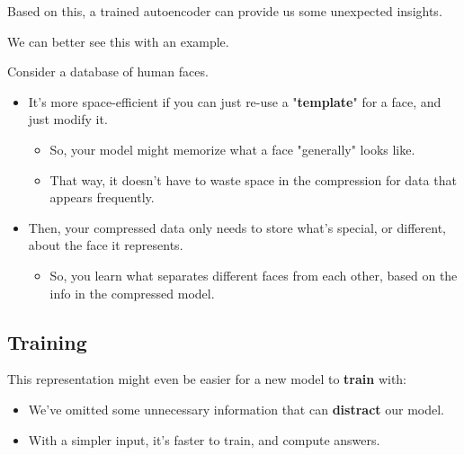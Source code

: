         Based on this, a trained autoencoder can provide us some unexpected insights.

        \subsecdiv

        We can better see this with an example.

        \miniex Consider a database of human faces.

        \begin{itemize}
            \item It's more space-efficient if you can just re-use a "\textbf{template}" for a face, and just modify it.
                \begin{itemize}
                    \item So, your model might memorize what a face "generally" looks like.
                    \item That way, it doesn't have to waste space in the compression for data that appears frequently.
                \end{itemize}
                
            \item Then, your compressed data only needs to store what's special, or different, about the face it represents.

                \begin{itemize}
                    \item So, you learn what separates different faces from each other, based on the info in the compressed model.
                \end{itemize}
        \end{itemize}

    \subsection{Training}

        This representation might even be easier for a new model to \textbf{train} with: 

            \begin{itemize}
                \item We've omitted some unnecessary information that can \textbf{distract} our model.
                \item With a simpler input, it's faster to train, and compute answers.\\
            \end{itemize}

